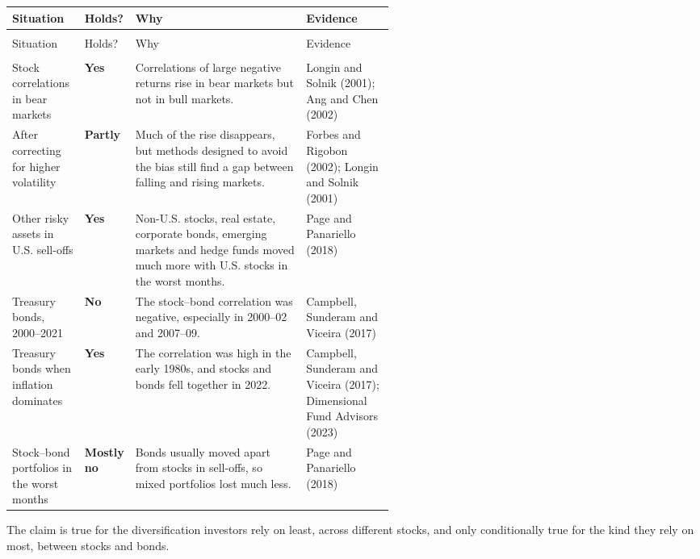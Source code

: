 {\small
\begin{longtable}{@{}>{\raggedright\arraybackslash}p{0.19\linewidth}>{\raggedright\arraybackslash}p{0.13\linewidth}>{\raggedright\arraybackslash}p{}>{\raggedright\arraybackslash}p{0.23\linewidth}@{}}
\toprule
Situation & Holds? & Why & Evidence \\
\midrule
\endfirsthead
\multicolumn{4}{@{}l}{\emph{(continued)}} \\
\toprule
Situation & Holds? & Why & Evidence \\
\midrule
\endhead
\midrule
\multicolumn{4}{r@{}}{\emph{(continued on the next page)}} \\
\endfoot
\bottomrule
\endlastfoot
Stock correlations in bear markets & \textbf{Yes} & Correlations of large negative returns rise in bear markets but not in bull markets. & Longin and Solnik (2001); Ang and Chen (2002) \\*
\addlinespace[3pt]
After correcting for higher volatility & \textbf{Partly} & Much of the rise disappears, but methods designed to avoid the bias still find a gap between falling and rising markets. & Forbes and Rigobon (2002); Longin and Solnik (2001) \\
\addlinespace[3pt]
Other risky assets in U.S. sell-offs & \textbf{Yes} & Non-U.S. stocks, real estate, corporate bonds, emerging markets and hedge funds moved much more with U.S. stocks in the worst months. & Page and Panariello (2018) \\
\addlinespace[3pt]
Treasury bonds, 2000--2021 & \textbf{No} & The stock--bond correlation was negative, especially in 2000--02 and 2007--09. & Campbell, Sunderam and Viceira (2017) \\
\addlinespace[3pt]
Treasury bonds when inflation dominates & \textbf{Yes} & The correlation was high in the early 1980s, and stocks and bonds fell together in 2022. & Campbell, Sunderam and Viceira (2017); Dimensional Fund Advisors (2023) \\*
\addlinespace[3pt]
Stock--bond portfolios in the worst months & \textbf{Mostly no} & Bonds usually moved apart from stocks in sell-offs, so mixed portfolios lost much less. & Page and Panariello (2018) \\
\end{longtable}
\addtocounter{table}{-1}%
}

The claim is true for the diversification investors rely on least, across different stocks, and only conditionally true for the kind they rely on most, between stocks and bonds.

